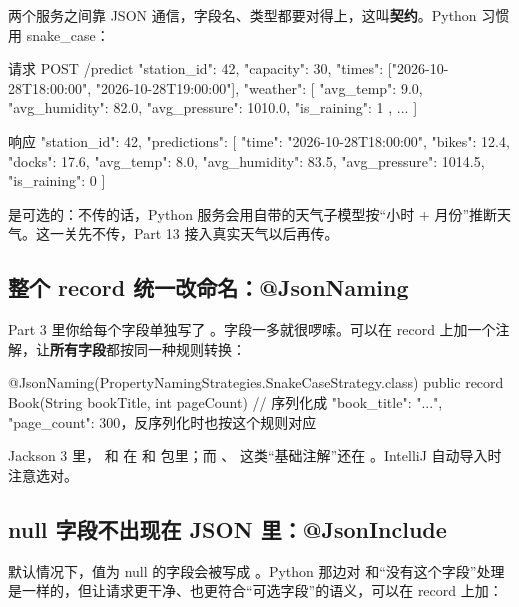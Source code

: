 两个服务之间靠 JSON 通信，字段名、类型都要对得上，这叫\textbf{契约}。Python 习惯用 snake\_case：

\begin{jsoncode}
请求  POST /predict
{
  "station_id": 42,
  "capacity": 30,
  "times": ["2026-10-28T18:00:00", "2026-10-28T19:00:00"],
  "weather": [ { "avg_temp": 9.0, "avg_humidity": 82.0, "avg_pressure": 1010.0, "is_raining": 1 }, ... ]
}

响应
{
  "station_id": 42,
  "predictions": [
    { "time": "2026-10-28T18:00:00", "bikes": 12.4, "docks": 17.6,
      "avg_temp": 8.0, "avg_humidity": 83.5, "avg_pressure": 1014.5, "is_raining": 0 }
  ]
}
\end{jsoncode}

 是可选的：不传的话，Python 服务会用自带的天气子模型按“小时 + 月份”推断天气。这一关先不传，Part 13 接入真实天气以后再传。

\subsection{整个 record 统一改命名：@JsonNaming}

Part 3 里你给每个字段单独写了 。字段一多就很啰嗦。可以在 record 上加一个注解，让\textbf{所有字段}都按同一种规则转换：

\begin{java}
@JsonNaming(PropertyNamingStrategies.SnakeCaseStrategy.class)
public record Book(String bookTitle, int pageCount) {}
// 序列化成 {"book_title": "...", "page_count": 300}，反序列化时也按这个规则对应
\end{java}

\begin{note}
Jackson 3 里， 和  在  和  包里；而 、 这类“基础注解”还在 。IntelliJ 自动导入时注意选对。
\end{note}

\subsection{null 字段不出现在 JSON 里：@JsonInclude}

默认情况下，值为 null 的字段会被写成 。Python 那边对  和“没有这个字段”处理是一样的，但让请求更干净、也更符合“可选字段”的语义，可以在 record 上加：

